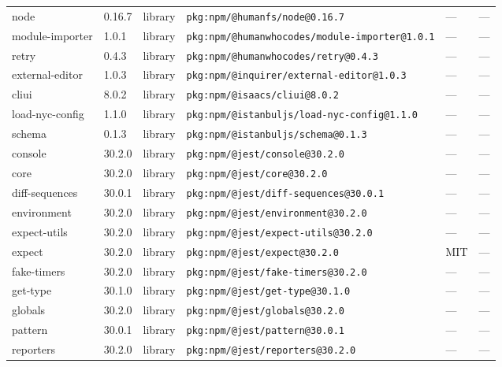 \documentclass[11pt,a4paper]{article}
\begin{document}
\begin{longtable}{|p{4cm}|p{2cm}|p{1.6cm}|p{5cm}|p{1.5cm}|p{3.5cm}|}
\raggedright node & 0.16.7 & library & \small\texttt{pkg:npm/@humanfs/node@0.16.7} & — & \small — \\
\raggedright module-importer & 1.0.1 & library & \small\texttt{pkg:npm/@humanwhocodes/module-importer@1.0.1} & — & \small — \\
\raggedright retry & 0.4.3 & library & \small\texttt{pkg:npm/@humanwhocodes/retry@0.4.3} & — & \small — \\
\raggedright external-editor & 1.0.3 & library & \small\texttt{pkg:npm/@inquirer/external-editor@1.0.3} & — & \small — \\
\raggedright cliui & 8.0.2 & library & \small\texttt{pkg:npm/@isaacs/cliui@8.0.2} & — & \small — \\
\raggedright load-nyc-config & 1.1.0 & library & \small\texttt{pkg:npm/@istanbuljs/load-nyc-config@1.1.0} & — & \small — \\
\raggedright schema & 0.1.3 & library & \small\texttt{pkg:npm/@istanbuljs/schema@0.1.3} & — & \small — \\
\raggedright console & 30.2.0 & library & \small\texttt{pkg:npm/@jest/console@30.2.0} & — & \small — \\
\raggedright core & 30.2.0 & library & \small\texttt{pkg:npm/@jest/core@30.2.0} & — & \small — \\
\raggedright diff-sequences & 30.0.1 & library & \small\texttt{pkg:npm/@jest/diff-sequences@30.0.1} & — & \small — \\
\raggedright environment & 30.2.0 & library & \small\texttt{pkg:npm/@jest/environment@30.2.0} & — & \small — \\
\raggedright expect-utils & 30.2.0 & library & \small\texttt{pkg:npm/@jest/expect-utils@30.2.0} & — & \small — \\
\raggedright expect & 30.2.0 & library & \small\texttt{pkg:npm/@jest/expect@30.2.0} & MIT & \small — \\
\raggedright fake-timers & 30.2.0 & library & \small\texttt{pkg:npm/@jest/fake-timers@30.2.0} & — & \small — \\
\raggedright get-type & 30.1.0 & library & \small\texttt{pkg:npm/@jest/get-type@30.1.0} & — & \small — \\
\raggedright globals & 30.2.0 & library & \small\texttt{pkg:npm/@jest/globals@30.2.0} & — & \small — \\
\raggedright pattern & 30.0.1 & library & \small\texttt{pkg:npm/@jest/pattern@30.0.1} & — & \small — \\
\raggedright reporters & 30.2.0 & library & \small\texttt{pkg:npm/@jest/reporters@30.2.0} & — & \small — \\

\end{longtable}
\end{document}
